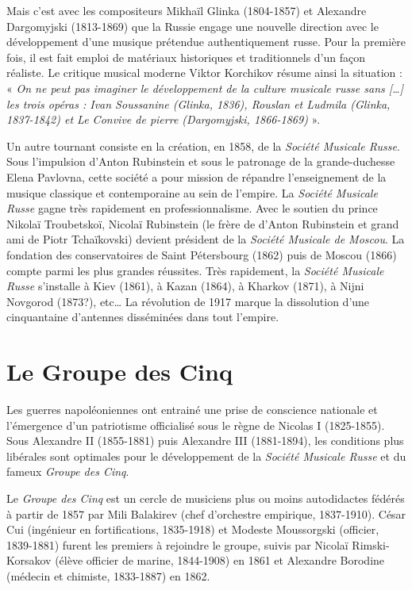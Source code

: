 Mais c'est avec les compositeurs Mikhaïl Glinka (1804-1857) et Alexandre Dargomyjski (1813-1869) que la Russie engage une nouvelle direction avec le développement d'une musique prétendue authentiquement russe. Pour la première fois, il est fait emploi de matériaux historiques et traditionnels d'un façon réaliste. Le critique musical moderne Viktor Korchikov résume ainsi la situation :\\
« \emph{On ne peut pas imaginer le développement de la culture musicale russe sans [\dots] les trois opéras : \emph{Ivan Soussanine} (Glinka, 1836), \emph{Rouslan et Ludmila} (Glinka, 1837-1842) et \emph{Le Convive de pierre} (Dargomyjski, 1866-1869)} ».

Un autre tournant consiste en la création, en 1858, de la \emph{Société Musicale Russe}. Sous l'impulsion d'Anton Rubinstein et sous le patronage de la grande-duchesse Elena Pavlovna, cette société a pour mission de répandre l'enseignement de la musique classique et contemporaine au sein de l'empire. La \emph{Société Musicale Russe} gagne très rapidement en professionnalisme. Avec le soutien du prince Nikolaï Troubetskoï, Nicolaï Rubinstein (le frère de d'Anton Rubinstein et grand ami de Piotr Tchaïkovski) devient président de la \emph{Société Musicale de Moscou}. La fondation des conservatoires de Saint Pétersbourg (1862) puis de Moscou (1866) compte parmi les plus grandes réussites. Très rapidement, la \emph{Société Musicale Russe} s'installe à Kiev (1861), à Kazan (1864), à Kharkov (1871), à Nijni Novgorod (1873?), etc\dots{} La révolution de 1917 marque la dissolution d'une cinquantaine d'antennes disséminées dans tout l'empire. 

\section{Le Groupe des Cinq}

Les guerres napoléoniennes ont entrainé une prise de conscience nationale et l’émergence d'un patriotisme officialisé sous le règne de Nicolas I\ier{} (1825-1855).  Sous Alexandre II (1855-1881) puis Alexandre III (1881-1894), les conditions plus libérales sont optimales pour le développement de la \emph{Société Musicale Russe} et du fameux \emph{Groupe des Cinq}.

Le \emph{Groupe des Cinq} est un cercle de musiciens plus ou moins autodidactes fédérés à partir de 1857 par Mili Balakirev (chef d'orchestre empirique, 1837-1910). César Cui (ingénieur en fortifications, 1835-1918) et Modeste Moussorgski (officier, 1839-1881) furent les premiers à rejoindre le groupe, suivis par Nicolaï Rimski-Korsakov (élève officier de marine, 1844-1908) en 1861 et Alexandre Borodine (médecin et chimiste, 1833-1887) en 1862.

